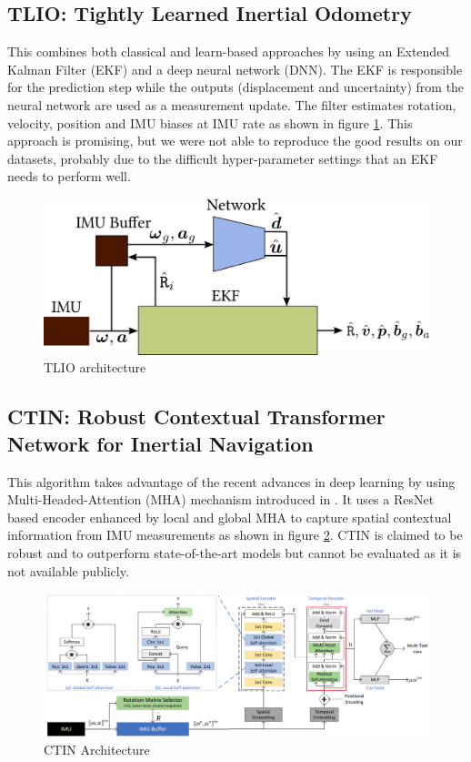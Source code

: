 \subsection{TLIO: Tightly Learned Inertial Odometry}
This combines both classical and learn-based approaches by using an Extended Kalman Filter (EKF) and a deep neural network (DNN). The EKF is responsible for the prediction step while the outputs (displacement and uncertainty) from the neural network are used as a measurement update. The filter estimates rotation, velocity, position and IMU biases at IMU rate \citep{liu2020tlio} as shown in figure \ref{fig:tlio}. This approach is promising, but we were not able to reproduce the good results on our datasets, probably due to the difficult hyper-parameter settings that an EKF needs to perform well.

\begin{figure}[H]
    \centering
    \includegraphics[scale=0.6]{images/fig_chapter3/tlio.png}
    \caption{TLIO architecture \citep{liu2020tlio}}
    \label{fig:tlio}
\end{figure}

\subsection{CTIN: Robust Contextual Transformer Network for Inertial Navigation}
This algorithm takes advantage of the recent advances in deep learning by using Multi-Headed-Attention (MHA) mechanism introduced in \citep{vaswani2017attention}. It uses a ResNet based encoder enhanced by local and global MHA to capture spatial contextual information from IMU measurements \citep{rao2022ctin} as shown in figure \ref{fig:ctin}. CTIN is claimed to be robust and to outperform state-of-the-art models but cannot be evaluated as it is not available publicly.

\begin{figure}[H]
    \centering
    \includegraphics[scale=0.2]{images/fig_chapter3/ctin.png}
    \caption{CTIN Architecture \citep{rao2022ctin}}
    \label{fig:ctin}
\end{figure}



